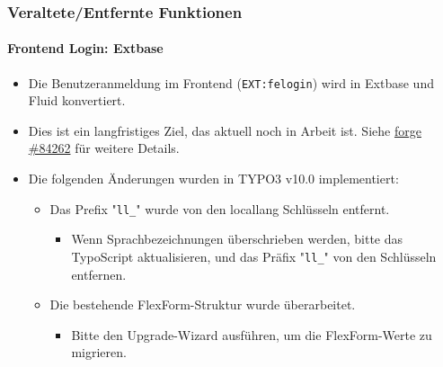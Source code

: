 \begin{frame}[fragile]
	\frametitle{Veraltete/Entfernte Funktionen}
	\framesubtitle{Frontend Login: Extbase}

	\begin{itemize}
		\item Die Benutzeranmeldung im Frontend (\texttt{EXT:felogin}) wird in Extbase und Fluid konvertiert.

		\item Dies ist ein langfristiges Ziel, das aktuell noch in Arbeit ist.\newline
			Siehe \href{https://forge.typo3.org/issues/84262}{forge \#84262} für weitere Details.

		\item Die folgenden Änderungen wurden in TYPO3 v10.0 implementiert:

		\begin{itemize}
			\item[\ding{202}] Das Prefix "\texttt{ll\_}" wurde von den locallang Schlüsseln entfernt.

				\begin{itemize}
					\item[\ding{228}] Wenn  Sprachbezeichnungen überschrieben werden, bitte das TypoScript aktualisieren, und das Präfix "\texttt{ll\_}" von den Schlüsseln entfernen.
				\end{itemize}

			\item[\ding{203}] Die bestehende FlexForm-Struktur wurde überarbeitet.

				\begin{itemize}
					\item[\ding{228}] Bitte den Upgrade-Wizard ausführen, um die FlexForm-Werte zu migrieren.
				\end{itemize}

		\end{itemize}

	\end{itemize}

\end{frame}


